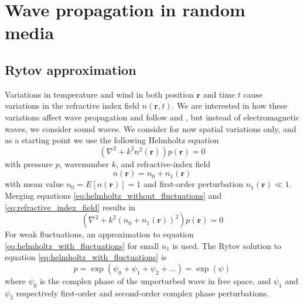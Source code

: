 \newpage
\section{Wave propagation in random media}

\subsection{Rytov approximation}
Variations in temperature and wind in both position $\mathbf{r}$ and time $t$ cause variations in the refractive index field $n(\mathbf{r},t)$.
We are interested in how these variations affect wave propagation and follow \cite{Ishimaru1997} and \cite{Jurado-navas2006}, but instead of electromagnetic waves, we consider sound waves.
We consider for now spatial variations only, and as a starting point we use the following Helmholtz equation %
\begin{equation}\label{eq:helmholtz_without_fluctuations}
 \left( \nabla^2 + k^2 n^2(\mathbf{r}) \right) p(\mathbf{r})= 0
\end{equation}
with pressure $p$, wavenumber $k$, and refractive-index field
\begin{equation}\label{eq:refractive_index_field}
 n(\mathbf{r}) = n_0 + n_1(\mathbf{r})
\end{equation}
with mean value $n_0 = E[n(\mathbf{r})] = 1$ and first-order perturbation $n_1(\mathbf{r}) \ll 1$. Merging equations \eqref{eq:helmholtz_without_fluctuations} and \eqref{eq:refractive_index_field} results in
\begin{equation}\label{eq:helmholtz_with_fluctuations}
 \left( \nabla^2 + k^2 (n_0 + n_1(\mathbf{r}))^2 \right) p(\mathbf{r}) = 0
\end{equation}
For weak fluctuations, an approximation to equation \eqref{eq:helmholtz_with_fluctuations} for small $n_1$ is used.
The Rytov solution to equation \eqref{eq:helmholtz_with_fluctuations} is
\begin{equation}
 p = \exp{\left(\psi_0 + \psi_1 + \psi_2 + \dots \right)} = \exp{(\psi)}
\end{equation}
where $\psi_0$ is the complex phase of the unperturbed wave in free space, and $\psi_1$ and $\psi_2$ respectively first-order and second-order complex phase perturbations.

